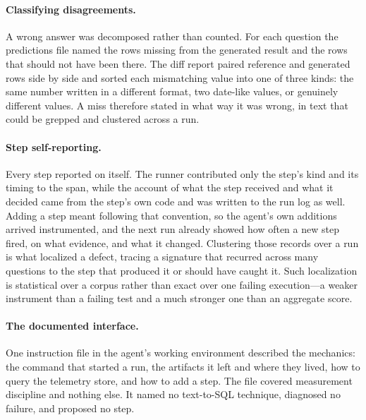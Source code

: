 \paragraph{Classifying disagreements.} A wrong answer was decomposed rather
than counted. For each question the predictions file named the rows missing
from the generated result and the rows that should not have been there. The
diff report paired reference and generated rows side by side and sorted each
mismatching value into one of three kinds: the same number written in a
different format, two date-like values, or genuinely different
values. A miss therefore stated in what way it was wrong, in text that could be
grepped and clustered across a run.

\paragraph{Step self-reporting.} Every step reported on itself. The runner
contributed only the step's kind and its timing to the span, while the account
of what the step received and what it decided came from the step's own code and
was written to the run log as well. Adding a step meant following that
convention, so the agent's own additions arrived instrumented, and the next run
already showed how often a new step fired, on what evidence, and what it
changed. Clustering those records over a run is what localized a defect,
tracing a signature that recurred across many questions to the step that
produced it or should have caught it. Such localization is statistical over a
corpus rather than exact over one failing execution---a weaker instrument than
a failing test and a much stronger one than an aggregate score.

\paragraph{The documented interface.} One instruction file in the agent's
working environment described the mechanics: the command that started a run,
the artifacts it left and where they lived, how to query the telemetry store,
and how to add a step. The file covered measurement discipline and nothing
else. It named no text-to-SQL technique, diagnosed no failure, and proposed no
step.

